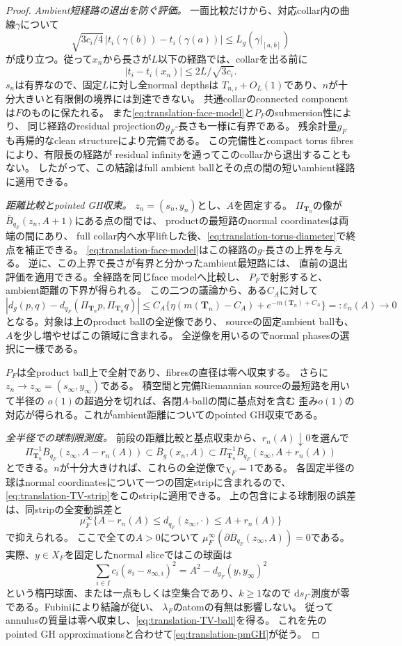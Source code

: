 \documentclass[11pt,a4paper]{ltjsarticle}
\newcommand{\dd}{\mathrm d}
\theoremstyle{plain}
\theoremstyle{definition}
\theoremstyle{remark}
\begin{document}
\begin{proof}
\emph{Ambient短経路の退出を防ぐ評価。}
一面比較だけから、対応collar内の曲線$\gamma$について
\[
 \sqrt{3c_i/4}\,|t_i(\gamma(b))-t_i(\gamma(a))|
 \le L_g(\gamma|_{[a,b]})
\]
が成り立つ。従って$x_n$から長さが$L$以下の経路では、collarを出る前に
\[
 |t_i-t_i(x_n)|\le 2L/\sqrt{3c_i}.
\]
$s_n$は有界なので、固定$L$に対し全normal depthsは
$T_{n,i}+O_L(1)$であり、$n$が十分大きいと有限側の境界には到達できない。
共通collarのconnected componentは$F$のものに保たれる。
また\eqref{eq:translation-face-model}と$P_F$のsubmersion性により、
同じ経路のresidual projectionの$g_F$-長さも一様に有界である。
残余計量$g_F$も再帰的なclean structureにより完備である。
この完備性とcompact torus fibresにより、有限長の経路が
residual infinityを通ってこのcollarから退出することもない。
したがって、この結論はfull ambient ballとその点の間の短いambient経路に適用できる。

\emph{距離比較とpointed GH収束。}
$z_n=(s_n,y_n)$とし、$A$を固定する。
$\Pi_{\bm T_n}$の像が$\overline B_{q_F}(z_n,A+1)$にある点の間では、
productの最短路のnormal coordinatesは両端の間にあり、
full collar内へ水平liftした後、\eqref{eq:translation-torus-diameter}で終点を補正できる。
\eqref{eq:translation-face-model}はこの経路の$g$-長さの上界を与える。
逆に、この上界で長さが有界と分かったambient最短路には、
直前の退出評価を適用できる。全経路を同じface modelへ比較し、
$P_F$で射影すると、ambient距離の下界が得られる。
この二つの議論から、ある$C_A$に対して
\[
 \left|d_g(p,q)-d_{q_F}(\Pi_{\bm T_n}p,\Pi_{\bm T_n}q)\right|
 \le C_A\{\eta(m(\bm T_n)-C_A)+e^{-m(\bm T_n)+C_A}\}
 =:\varepsilon_n(A)\longrightarrow0
\]
となる。対象は上のproduct ballの全逆像であり、
sourceの固定ambient ballも、$A$を少し増やせばこの領域に含まれる。
全逆像を用いるのでnormal phasesの選択に一様である。

$P_F$は全product ball上で全射であり、fibresの直径は零へ収束する。
さらに$z_n\to z_\infty=(s_\infty,y_\infty)$である。
積空間と完備Riemannian sourceの最短路を用いて半径の
$o(1)$の超過分を切れば、各閉$A$-ballの間に基点対を含む
歪み$o(1)$の対応が得られる。これがambient距離についてのpointed GH収束である。

\emph{全半径での球制限測度。}
前段の距離比較と基点収束から、$r_n(A)\downarrow0$を選んで
\[
 \Pi_{\bm T_n}^{-1}\overline B_{q_F}(z_\infty,A-r_n(A))
 \subset\overline B_g(x_n,A)
 \subset
 \Pi_{\bm T_n}^{-1}\overline B_{q_F}(z_\infty,A+r_n(A))
\]
とできる。$n$が十分大きければ、これらの全逆像で$\chi_F=1$である。
各固定半径の球はnormal coordinatesについて一つの固定stripに含まれるので、
\eqref{eq:translation-TV-strip}をこのstripに適用できる。
上の包含による球制限の誤差は、同stripの全変動誤差と
\[
 \mu_F^\infty\{A-r_n(A)\le d_{q_F}(z_\infty,\cdot)
                              \le A+r_n(A)\}
\]
で抑えられる。
ここで全ての$A>0$について
$\mu_F^\infty(\partial\overline B_{q_F}(z_\infty,A))=0$である。
実際、$y\in X_F$を固定したnormal sliceではこの球面は
\[
 \sum_{i\in I}c_i(s_i-s_{\infty,i})^2
 =A^2-d_{g_F}(y,y_\infty)^2
\]
という楕円球面、または一点もしくは空集合であり、$k\ge1$なので
$\dd s_I$-測度が零である。Fubiniにより結論が従い、
$\lambda_F$のatomの有無は影響しない。
従ってannulusの質量は零へ収束し、\eqref{eq:translation-TV-ball}を得る。
これを先のpointed GH approximationsと合わせて\eqref{eq:translation-pmGH}が従う。
\end{proof}
\end{document}
